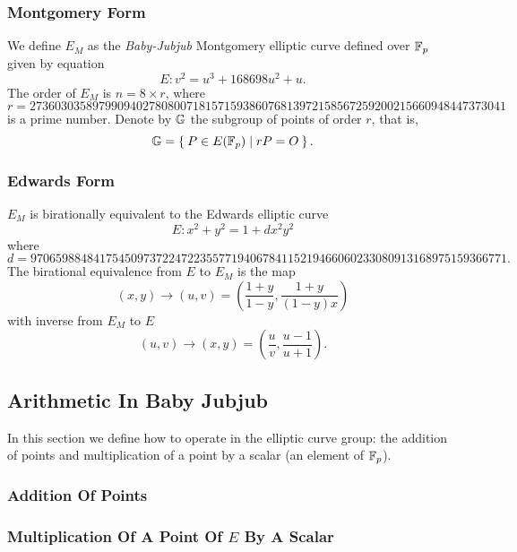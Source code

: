 \documentclass{article}
\begin{document}
\begin{spacing}{1.2}
		\subsubsection{Montgomery Form}
		We define $E_M$ as the {\it Baby-Jubjub} Montgomery elliptic curve defined over $\mathbb{F}_p$ given %
		by equation
		$$	E: v^2 = u^3 +  168698u^2 + u. $$
		The order of $E_M$ is $n = 8\times r$, where 
		$$	r = 2736030358979909402780800718157159386076813972
		158567259200215660948447373041 $$ 
		is a prime number. Denote by $\mathbb{G}$ the subgroup of points of order $r$, that is, %
		$$\mathbb{G} = \Set{ P \in E(\ensuremath{\mathbb{F}_p}) | r P = O  }.$$

		\subsubsection{Edwards Form}
		$E_M$ is birationally equivalent to the Edwards elliptic curve %
			$$	E: x^2 + y^2 = 1 +  d x^2 y^2 $$
		where
		$ d = 9706598848417545097372247223557719406784115219466060233080913168975159366771.$ \\
		
	
		The birational equivalence \cite[Thm. 3.2]{twisted} from $E$ to $E_M$ is the map
		$$ (x,y) \to (u,v) = \left( \frac{1 + y}{1 - y} , \frac{1 + y}{(1 - y)x} \right) $$
		with inverse from $E_M$ to $E$
		$$ (u, v) \to (x, y) = \left(  \frac{u}{v}, \frac{u - 1}{u + 1}   \right). $$
		
	\subsection{Arithmetic In Baby Jubjub}
	In this section we define how to operate in the elliptic curve group: %
	the addition of points and multiplication of a point by a scalar (an element of $\mathbb{F}_p$).
	 	\subsubsection{Addition Of Points} 
	 	\subsubsection{Multiplication Of A Point Of $E$ By A Scalar} 


\end{spacing}
\end{document}

